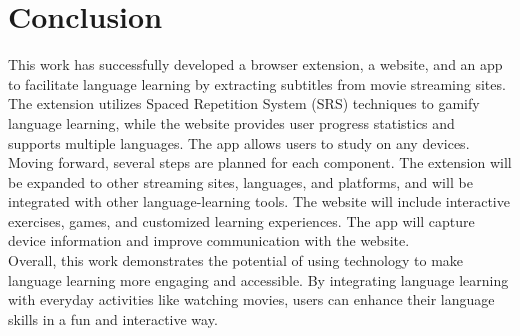 \documentclass[12pt]{article}
\begin{document}
\section{
Conclusion
}
This work has successfully developed a browser extension, a website, and an app to facilitate language learning by extracting subtitles from movie streaming sites. The extension utilizes Spaced Repetition System (SRS) techniques to gamify language learning, while the website provides user progress statistics and supports multiple languages. The app allows users to study on any devices. \\
Moving forward, several steps are planned for each component. The extension will be expanded to other streaming sites, languages, and platforms, and will be integrated with other language-learning tools. The website will include interactive exercises, games, and customized learning experiences. The app will capture device information and improve communication with the website. \\
Overall, this work demonstrates the potential of using technology to make language learning more engaging and accessible. By integrating language learning with everyday activities like watching movies, users can enhance their language skills in a fun and interactive way.




\hfill \\
\hfill \\
\hfill \\
\hfill \\
\hfill \\
\hfill \\
\hfill \\
\hfill 
\centering
\end{document}
